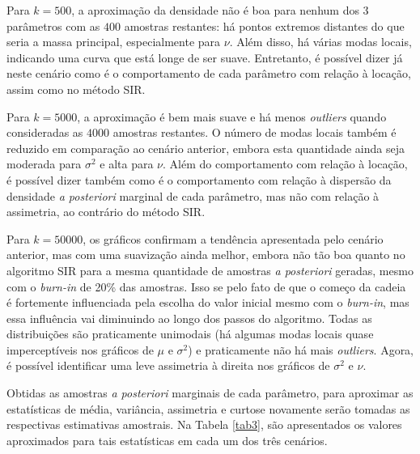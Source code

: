 Para $k=500$, a aproximação da densidade não é boa para nenhum dos 3 parâmetros com as $400$ amostras restantes: há pontos extremos distantes do que seria a massa principal, especialmente para $\nu$. Além disso, há várias modas locais, indicando uma curva que está longe de ser suave. Entretanto, é possível dizer já neste cenário como é o comportamento de cada parâmetro com relação à locação, assim como no método SIR.

Para $k=5000$, a aproximação é bem mais suave e há menos \textit{outliers} quando consideradas as $4000$ amostras restantes. O número de modas locais também é reduzido em comparação ao cenário anterior, embora esta quantidade ainda seja moderada para $\sigma^2$ e alta para $\nu$. Além do comportamento com relação à locação, é possível dizer também como é o comportamento com relação à dispersão da densidade \textit{a posteriori} marginal de cada parâmetro, mas não com relação à assimetria, ao contrário do método SIR.

Para $k=50000$, os gráficos confirmam a tendência apresentada pelo cenário anterior, mas com uma suavização ainda melhor, embora não tão boa quanto no algoritmo SIR para a mesma quantidade de amostras \textit{a posteriori} geradas, mesmo com o \textit{burn-in} de 20\% das amostras. Isso se pelo fato de que o começo da cadeia é fortemente influenciada pela escolha do valor inicial mesmo com o \textit{burn-in}, mas essa influência vai diminuindo ao longo dos passos do algoritmo. Todas as distribuições são praticamente unimodais (há algumas modas locais quase imperceptíveis nos gráficos de $\mu$ e $\sigma^2$) e praticamente não há mais \textit{outliers}. Agora, é possível identificar uma leve assimetria à direita nos gráficos de $\sigma^2$ e $\nu$.

Obtidas as amostras \textit{a posteriori} marginais de cada parâmetro, para aproximar as estatísticas de média, variância, assimetria e curtose novamente serão tomadas as respectivas estimativas amostrais. Na Tabela \ref{tab3}, são apresentados os valores aproximados para tais estatísticas em cada um dos três cenários.

